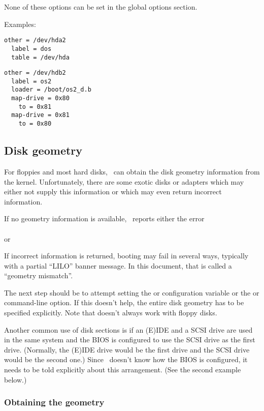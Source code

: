 None of these options can be set in the global options section.

Examples:
\begin{verbatim}
other = /dev/hda2
  label = dos
  table = /dev/hda
\end{verbatim}

\begin{verbatim}
other = /dev/hdb2
  label = os2
  loader = /boot/os2_d.b
  map-drive = 0x80
    to = 0x81
  map-drive = 0x81
    to = 0x80
\end{verbatim}


\subsection{Disk geometry}
\label{diskgeo}

For floppies and most hard disks, \LILO\ can obtain the
disk geometry information from the kernel. Unfortunately, there are some
exotic disks or adapters which may either not supply this information or
which may even return incorrect information.

If no geometry information is available, \LILO\ reports either the error \\
 \\
or \\

If incorrect information is returned, booting may fail in several ways,
typically with a partial ``LILO'' banner message. In this document, that
is called a ``geometry mismatch''.

The next step should be to attempt setting the  or  
configuration variable or the  or  command-line option. If
this doesn't help, the entire disk geometry has to be specified explicitly.
Note that  doesn't always work with floppy disks.

Another common use of disk sections is if an (E)IDE and a SCSI drive are
used in the same system and the BIOS is configured to use the SCSI drive
as the first drive. (Normally, the (E)IDE drive would be the first drive
and the SCSI drive would be the second one.) Since \LILO\ doesn't know
how the BIOS is configured, it needs to be told explicitly about this
arrangement. (See the second example below.)


\subsubsection{Obtaining the geometry}

